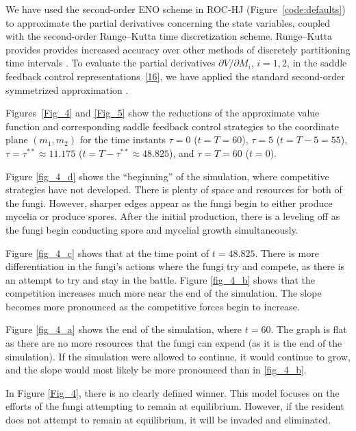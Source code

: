 \documentclass[11pt]{amsart}
\begin{document}
We have used the second-order ENO scheme in ROC-HJ (Figure~\ref{code:defaults}) to approximate the partial
derivatives concerning the state variables, coupled with the 
second-order Runge--Kutta time discretization scheme. Runge--Kutta provides provides increased accuracy over other methods of discretely partitioning time intervals \cite{ROCHJ2019}.
To evaluate the partial derivatives $ \partial V / \partial M_i $, $ i = 1,2 $,
in the saddle feedback control representations~\cref{16}, we have applied the
standard second-order symmetrized approximation
\cite[\S 5.7]{PressTeukolskyVetterlingFlannery2007}.

Figures~\ref{Fig_4} and \ref{Fig_5} show the reductions of the approximate
value function and corresponding saddle feedback control strategies to the
coordinate plane $ (m_1, m_2) $ for the time instants 
$ \tau = 0 $ ($ t = T = 60 $), $ \tau = 5 $ ($ t = T - 5 = 55 $),
$ \tau = \tau^{**} 
\approx 11.175 $ ($ t = T - \tau^{**} \approx 48.825 $),
and $ \tau = T = 60 $ ($ t = 0 $). 


Figure \ref{fig_4_d} shows the ``beginning'' of the simulation, where competitive strategies have not developed. There is plenty of space and resources for both of the fungi. However, sharper edges appear as the fungi begin to either produce mycelia or produce spores. After the initial production, there is a leveling off as the fungi begin conducting spore and mycelial growth simultaneously.

Figure \ref{fig_4_c} shows that at the time point of $t=48.825$. There is more differentiation in the fungi's actions where the fungi try and compete, as there is an attempt to try and stay in the battle. Figure \ref{fig_4_b} shows that the competition increases much more near the end of the simulation. The slope becomes more pronounced as the competitive forces begin to increase.

Figure \ref{fig_4_a} shows the end of the simulation, where $t=60$. The graph is flat as there are no more resources that the fungi can expend (as it is the end of the simulation). If the simulation were allowed to continue, it would continue to grow, and the slope would most likely be more pronounced than in \ref{fig_4_b}. 

In Figure \ref{Fig_4}, there is no clearly defined winner. This model focuses on the efforts of the fungi attempting to remain at equilibrium. However, if the resident does not attempt to remain at equilibrium, it will be invaded and eliminated.
\end{document}
